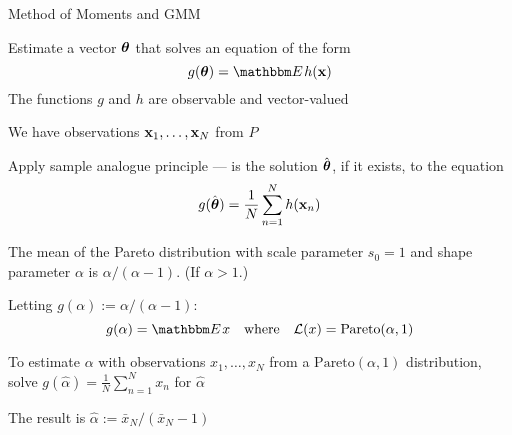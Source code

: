 \begin{frame}{Method of Moments and GMM}

     \vspace{2em}
    Estimate a vector ${\boldsymbol \theta}$ that solves an equation of the form
    \begin{equation*}
        \label{eq:mm}
        g(\boldtheta) = \EE h( \boldx )
    \end{equation*}
    The functions $g$ and $h$ are observable and vector-valued
    
    \vspace{.7em}
    We have observations ${\mathbf x}_1, \ldots, {\mathbf x}_N$ from $P$
    
    Apply sample analogue principle ---  
    is the solution $\hat {{\boldsymbol \theta}}$, if it
    exists, to the equation
    \begin{equation}
        \label{eq:mme}
        g(\hat {{\boldsymbol \theta}}) = \frac{1}{N} \sum_{n=1}^N h({\mathbf x}_n)
    \end{equation}

\end{frame}

\begin{frame}

    \vspace{2em}
    \Eg
    The mean of the Pareto distribution with scale parameter $s_0 = 1$ and
    shape parameter $\alpha$ is $\alpha /
    (\alpha - 1)$.  (If $\alpha > 1$.)
    
    \vspace{.7em}
    Letting $g(\alpha) := \alpha / (\alpha - 1)$:
    \begin{equation*}
        g(\alpha) = \EE x
        \quad \text{where} \quad
        \lL(x) = \text{Pareto}(\alpha, 1)
    \end{equation*}
    
    \vspace{.7em}
    To estimate $\alpha$ with observations $x_1, \ldots, x_N$ from a
    $\text{Pareto}(\alpha, 1)$ distribution, solve $g(\hat \alpha) = \frac{1}{N}
    \sum_{n=1}^N x_n$ for $\hat \alpha$
    
    The result is
        $\hat \alpha := \bar x_N/(\bar x_N - 1)$

\end{frame}

